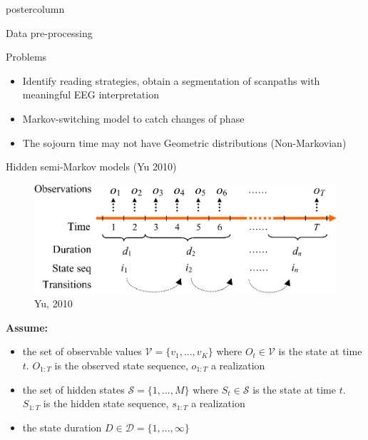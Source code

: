 \documentclass[final,hyperref={pdfpagelabels=false}]{beamer}
\begin{document}
\begin{frame}
\begin{columns}
\begin{column}{.50\textwidth}
\begin{beamercolorbox}[center,wd=\textwidth]{postercolumn}
\begin{minipage}[T]{.98\textwidth}
{\begin{block}{Data pre-processing}
            \end{block}
            \vfill
            \begin{block}{Problems}
                \begin{itemize}
                    \item[\bullet] Identify reading strategies, obtain a segmentation of scanpaths with meaningful EEG interpretation
                    \item[\bullet] Markov-switching model to catch changes of phase
                    \item[\bullet] The sojourn time may not have Geometric distributions (Non-Markovian)
                \end{itemize}
            \end{block}
            \vfill
            \begin{block}{Hidden semi-Markov models (Yu 2010)}
                \begin{figure}[H]
                    \includegraphics[width=.60\linewidth]{hsmm_representation.png}
                    \caption{Yu, 2010}
                \end{figure}
                \vskip-2cm
                \textbf{Assume:}
                \begin{itemize}
                    \item[\bullet] the set of observable values $\mathcal{V} = \{ v_1,..., v_K\}$
                    where $O_t \in \mathcal{V}$ is the state at time $t$. $O_{1:T}$ is the observed state sequence,
                    $o_{1:T}$ a realization
                    \item[\bullet] the set of hidden states $\mathcal{S}=\{1,...,M\}$
                    where $S_t \in \mathcal{S}$ is the state at time $t$. $S_{1:T}$ is the hidden state sequence,
                    $s_{1:T}$ a realization
                    \item[\bullet] the state duration $D \in \mathcal{D}=\{1,...,\infty\}$
                \end{itemize}


\end{block}}
\end{minipage}
\end{beamercolorbox}
\end{column}
\end{columns}
\end{frame}
\end{document}

